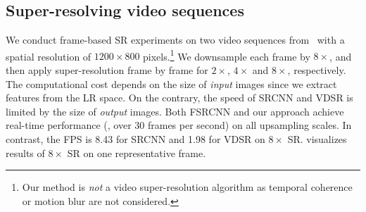 \documentclass[10pt,twocolumn,letterpaper]{article}
\begin{document}
	\subsection{Super-resolving video sequences}
	We conduct frame-based SR experiments on two video sequences from~\cite{Liao-ICCV-2015} with a spatial resolution of $1200 \times 800$ pixels.\footnote{Our method is \emph{not} a video super-resolution algorithm as temporal coherence or motion blur are not considered.}
	We downsample each frame by $8\times$, and then apply super-resolution frame by frame for $2\times$, $4\times$ and $8\times$, respectively. 
	The computational cost depends on the size of \textit{input} images since we extract features from the LR space.
	On the contrary, the speed of SRCNN and VDSR is limited by the size of \textit{output} images.
	Both FSRCNN and our approach achieve real-time performance (\ie, over 30 frames per second) on all upsampling scales.
	In contrast, the FPS is 8.43 for SRCNN and 1.98 for VDSR on $8\times$ SR.
	 visualizes results of $8\times$ SR on one representative frame. 
	
	
	
\end{document}
